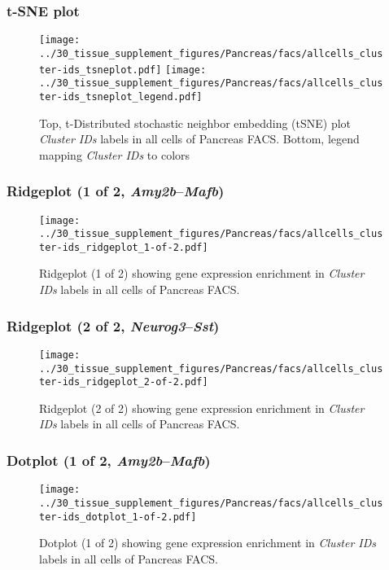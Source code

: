 \clearpage
\subsubsection{t-SNE plot}
\begin{figure}[h]
\centering
\texttt{[image: ../30\_tissue\_supplement\_figures/Pancreas/facs/allcells\_cluster-ids\_tsneplot.pdf]}
\texttt{[image: ../30\_tissue\_supplement\_figures/Pancreas/facs/allcells\_cluster-ids\_tsneplot\_legend.pdf]}
\caption{Top, t-Distributed stochastic neighbor embedding (tSNE) plot  \emph{Cluster IDs} labels in all cells of Pancreas FACS. Bottom, legend mapping \emph{Cluster IDs} to colors}
\end{figure}


\clearpage

\subsubsection{Ridgeplot (1 of 2, \emph{Amy2b}--\emph{Mafb})}
\begin{figure}[h]
\centering
\texttt{[image: ../30\_tissue\_supplement\_figures/Pancreas/facs/allcells\_cluster-ids\_ridgeplot\_1-of-2.pdf]}

\caption{ Ridgeplot (1 of 2)  showing gene expression enrichment in \emph{Cluster IDs} labels in all cells of Pancreas FACS. }
\end{figure}


\clearpage

\subsubsection{Ridgeplot (2 of 2, \emph{Neurog3}--\emph{Sst})}
\begin{figure}[h]
\centering
\texttt{[image: ../30\_tissue\_supplement\_figures/Pancreas/facs/allcells\_cluster-ids\_ridgeplot\_2-of-2.pdf]}

\caption{ Ridgeplot (2 of 2)  showing gene expression enrichment in \emph{Cluster IDs} labels in all cells of Pancreas FACS. }
\end{figure}


\clearpage

\subsubsection{Dotplot (1 of 2, \emph{Amy2b}--\emph{Mafb})}
\begin{figure}[h]
\centering
\texttt{[image: ../30\_tissue\_supplement\_figures/Pancreas/facs/allcells\_cluster-ids\_dotplot\_1-of-2.pdf]}

\caption{ Dotplot (1 of 2)  showing gene expression enrichment in \emph{Cluster IDs} labels in all cells of Pancreas FACS. }
\end{figure}


